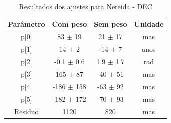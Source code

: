 \documentclass[11pt,a4paper]{report}
\begin{document}
\begin{table}[h!]
\caption{\label{Tab: Nereida-Dec} Resultados dos ajustes para Nereida - DEC}
\begin{centering}
\begin{tabular}{cccc}
\hline
\hline
Parâmetro & Com peso & Sem peso & Unidade\tabularnewline
\hline
p[0] & 83 $\pm$ 19 & 21 $\pm$ 17 & mas\\
p[1] & 14 $\pm$ 2 & -14 $\pm$ 7 & anos\\
p[2] & -0.1 $\pm$ 0.6 & 1.9 $\pm$ 1.7 & rad\\
p[3] & 165 $\pm$ 87 & -40 $\pm$ 51 & mas\\
p[4] & -186 $\pm$ 158 & -63 $\pm$ 92 & mas\\
p[5] & -182 $\pm$ 172 & -70 $\pm$ 93 & mas\\
Residuo & 1120 & 820 & mas\\
\hline 
\end{tabular} 
\par\end{centering}
\end{table}
\end{document}

